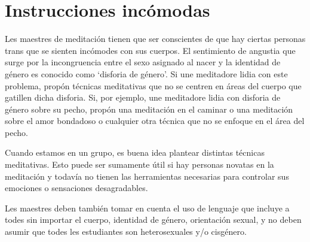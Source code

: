 \documentclass[12pt,openany]{book}
\begin{document}
\section*{Instrucciones incómodas}

Les maestres de meditación tienen que ser conscientes de que hay ciertas personas trans que se sienten incómodes con sus cuerpos. El sentimiento de angustia que surge por la incongruencia entre el sexo asignado al nacer y la identidad de género es conocido como `disforia de género'. Si une meditadore lidia con este problema, propón técnicas meditativas que no se centren en áreas del cuerpo que gatillen dicha disforia. Si, por ejemplo, une meditadore lidia con disforia de género sobre su pecho, propón una meditación en el caminar o una meditación sobre el amor bondadoso o cualquier otra técnica que no se enfoque en el área del pecho.

Cuando estamos en un grupo, es buena idea plantear distintas técnicas meditativas. Esto puede ser sumamente útil si hay personas novatas en la meditación y todavía no tienen las herramientas necesarias para controlar sus emociones o sensaciones desagradables.

Les maestres deben también tomar en cuenta el uso de lenguaje que incluye a todes sin importar el cuerpo, identidad de género, orientación sexual, y no deben asumir que todes les estudiantes son heterosexuales y/o cisgénero.

\newpage
\thispagestyle{empty}

\vfill

\begin{figure}[h]
    \centering
\end{figure}
\end{document}
